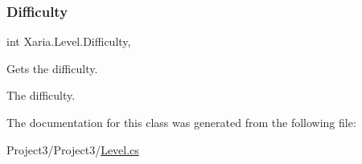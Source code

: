 \subsubsection{\texorpdfstring{Difficulty}{Difficulty}}
{\footnotesize\ttfamily int Xaria.\+Level.\+Difficulty\hspace{0.3cm}{\ttfamily [get]}, {}}



Gets the difficulty. 

The difficulty. 

The documentation for this class was generated from the following file\+:\begin{DoxyCompactItemize}
\item 
Project3/\+Project3/\hyperlink{Level_8cs}{Level.\+cs}\end{DoxyCompactItemize}
